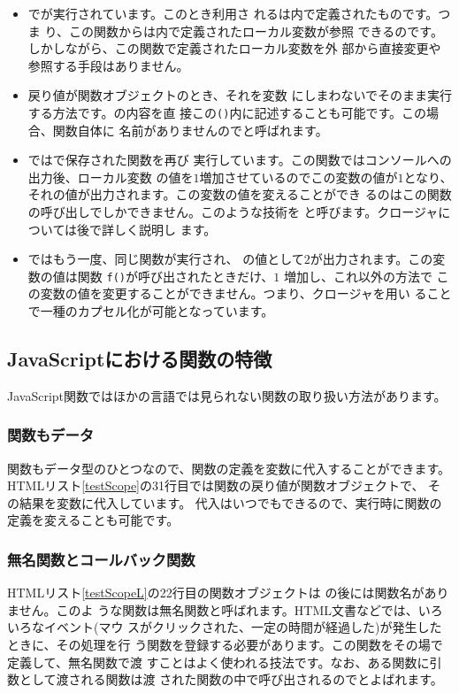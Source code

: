 \begin{itemize}
 \item {}でが実行されています。このとき利用さ
       れるは内で定義されたものです。つま
       り、この関数からは内で定義されたローカル変数が参照
       できるのです。しかしながら、この関数で定義されたローカル変数を外
       部から直接変更や参照する手段はありません。
 \item {}戻り値が関数オブジェクトのとき、それを変数
       にしまわないでそのまま実行する方法です。の内容を直
       接この\texttt{()}内に記述することも可能です。この場合、関数自体に
       名前がありませんのでと呼ばれます。
 \item {}ではで保存された関数を再び
       実行しています。この関数ではコンソールへの出力後、ローカル変数
       の値を$1$増加させているのでこの変数の値が$1$となり、
       それの値が出力されます。この変数の値を変えることができ
       るのはこの関数の呼び出しでしかできません。このような技術を
       と呼びます。クロージャについては後で詳しく説明し
       ます。
 \item {}ではもう一度、同じ関数が実行され、
       の値として$2$が出力されます。この変数の値は関数
       \texttt{f()}が呼び出されたときだけ、$1$ 増加し、これ以外の方法で
       この変数の値を変更することができません。つまり、クロージャを用い
       ることで一種のカプセル化が可能となっています。
\end{itemize}
\subsection{JavaScriptにおける関数の特徴}
JavaScript関数ではほかの言語では見られない関数の取り扱い方法があります。
\subsubsection{関数もデータ}
関数もデータ型のひとつなので、関数の定義を変数に代入することができます。
HTMLリスト\ref{testScope}の31行目では関数の戻り値が関数オブジェクトで、
その結果を変数に代入しています。
代入はいつでもできるので、実行時に関数の定義を変えることも可能です。
\subsubsection{無名関数とコールバック関数}
HTMLリスト\ref{testScopeL}の22行目の関数オブジェクトは
の後には関数名がありません。このよ
うな関数は無名関数と呼ばれます。HTML文書などでは、いろいろなイベント(マウ
スがクリックされた、一定の時間が経過した)が発生したときに、その処理を行
う関数を登録する必要があります。この関数をその場で定義して、無名関数で渡
すことはよく使われる技法です。なお、ある関数に引数として渡される関数は渡
された関数の中で呼び出されるのでとよばれます。

